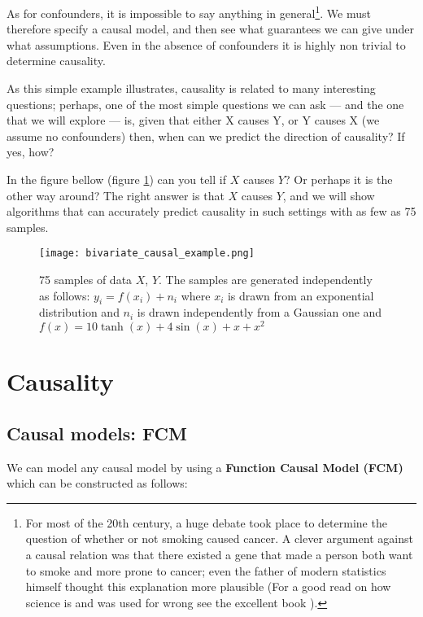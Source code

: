 As for confounders, it is impossible to say anything in general\footnote{
    For most of the 20th century, a huge debate took place to determine the question of whether or not 
    smoking caused cancer. A clever argument against a causal relation was that there existed a gene that 
    made a person both want to smoke and more prone to cancer; even the father of modern statistics
    himself thought this explanation more plausible (For a good read on how science is and was used 
    for wrong see the excellent book \cite{NaomiMerchants}).
    
}. We must therefore specify a causal model, and
then see what guarantees we can give under what assumptions. Even in the absence of confounders it is highly 
non trivial to determine causality.

As this simple example illustrates, causality is related to many interesting questions; perhaps, one of the most 
simple questions we can ask --- and the one that we will explore --- is, given that either X causes Y, or Y causes X
(we assume no confounders) then, when 
can we predict the direction of causality? If yes, how? 

In the figure bellow (figure \ref{fig:simple_bivariate_example}) can you tell if $X$ causes $Y$? Or perhaps
it is the other way around? The right answer is that $X$ causes $Y$, and we will show algorithms that 
can accurately predict causality in such settings with as few as 75 samples. 

\begin{figure}[H]
    \centering
    \texttt{[image: bivariate\_causal\_example.png]}
    \caption{75 samples of data $X$, $Y$.  The samples are generated independently as follows:
    $y_i = f(x_i) + n_i$ where $x_i$ is drawn from an exponential distribution and $n_i$ is drawn 
    independently from a Gaussian one and $f(x) = 10 \tanh(x) + 4\sin(x) + x + x^2$}
    \label{fig:simple_bivariate_example}
\end{figure}

\section{Causality}

\subsection{Causal models: FCM}

We can model any causal model by using a \textbf{Function Causal Model (FCM)} which can be constructed as follows:

